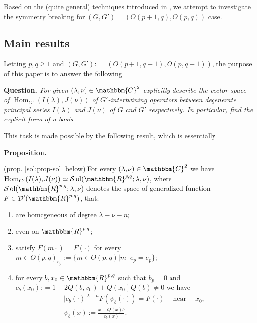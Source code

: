 \documentclass{article}
\newcommand{\assign}{:=}
\newcommand{\tmop}[1]{\ensuremath{\operatorname{#1}}}
\newcommand{\tmtextbf}[1]{{\bfseries{#1}}}
\newcommand{\tmtextit}[1]{{\itshape{#1}}}
\numberwithin{definition}{section}
\numberwithin{lemma}{section}
\numberwithin{proposition}{section}
{\theorembodyfont{\rmfamily}\newtheorem{remark}{Remark}
\numberwithin{remark}{section}
}
\begin{document}
Based on the (quite general) techniques introduced in
{\cite{kobayashi2015symmetry}}, we attempt to investigate the symmetry
breaking for $( G, G') = ( O ( p + 1, q), O ( p, q))$ case.

\subsection{Main results}

Letting $p, q \geqslant 1$ and $( G, G') : = ( O ( p + 1, q + 1), O ( p, q +
1))$, the purpose of this paper is to answer the following

{\noindent}\tmtextbf{Question. }\tmtextit{For given $( \lambda, \nu) \in
\mathbbm{C}^2$ explicitly describe the vector space of $\tmop{Hom}_{G'} ( I (
\lambda), J ( \nu))$ of $G'$-intertwining operators between degenerate
principal series $I ( \lambda)$ and $J ( \nu)$ of $G$ and $G'$ respectively.
In particular, find the explicit form of a basis.}{\hspace*{\fill}}{\medskip}

{\noindent}This task is made possible by the following result, which is
essentially {\cite[thm. 3.16]{kobayashi2015symmetry}}

{\noindent}\tmtextbf{Proposition. }\tmtextit{(prop. \ref{sol:prop-sol} below)
For every $( \lambda, \nu) \in \mathbbm{C}^2$ we have $\tmop{Hom}_{G'} ( I (
\lambda), J ( \nu)) \simeq \mathcal{S} \tmop{ol} ( \mathbbm{R}^{p, q} ;
\lambda, \nu)$, where $\mathcal{S} \tmop{ol} ( \mathbbm{R}^{p, q} ; \lambda,
\nu)$ denotes the space of generalized function $F \in \mathcal{D}' (
\mathbbm{R}^{p, q})$, that:
\begin{enumerate}
  \item are homogeneous of degree $\lambda - \nu - n$;
  
  \item even on $\mathbbm{R}^{p, q}$;
  
  \item satisfy $F ( m \cdot) = F ( \cdot)$ for every $m \in O ( p, q)_{e_p}
  \assign \{ m \in O ( p, q) | m \cdot e_p = e_p \}$;
  
  \item for every $b, x_0 \in \mathbbm{R}^{p, q}$ such that $b_p = 0$ and $c_b
  ( x_0) : = 1 - 2 Q ( b, x_0) + Q ( x_0) Q ( b) \neq 0$ we have
  \begin{eqnarray}
    & | c_b ( \cdot) |^{\lambda - n} F ( \psi_b ( \cdot)) = F (\cdot)
    \hspace{1em} \tmop{near} \hspace{1em} x_0, &  \nonumber\\
    & \psi_b ( x) \assign \frac{x - Q (x) b}{c_b ( x)} . &  \nonumber
  \end{eqnarray}
\end{enumerate}}{\hspace*{\fill}}{\medskip}
\end{document}

